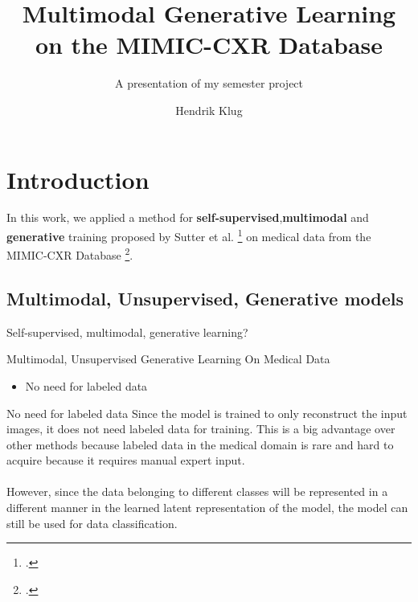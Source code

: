 

\title{Multimodal Generative Learning on the MIMIC-CXR Database}
\subtitle{A presentation of my semester project}
\author{Hendrik Klug}

    \begin{frame}
        \titlepage
    \end{frame}


    \section{Introduction}

    \begin{frame}
        In this work, we applied a method for \textbf{self-supervised},\textbf{multimodal} and \textbf{generative} training proposed by Sutter et al. \footcite{thomas_multimodal} on medical data from the MIMIC-CXR Database \footcite{johnson2019mimic}.
    \end{frame}

    \subsection{Multimodal, Unsupervised, Generative models}
    \begin{frame}{Self-supervised, multimodal, generative learning?}
    \end{frame}

    \begin{frame}{Multimodal, Unsupervised Generative Learning On Medical Data}
        \begin{itemize}
            \item No need for labeled data
        \end{itemize}
    \end{frame}
    
    \begin{frame}{No need for labeled data}
    Since the model is trained to only reconstruct the input images, it does not need labeled data for training.
    This is a big advantage over other methods because labeled data in the medical domain is rare and hard to acquire because it requires manual expert input.\\
    \\
    \pause
    However, since the data belonging to different classes will be represented in a different manner in the learned latent representation of the model, the model can still be used for data classification.
    \end{frame}
    
